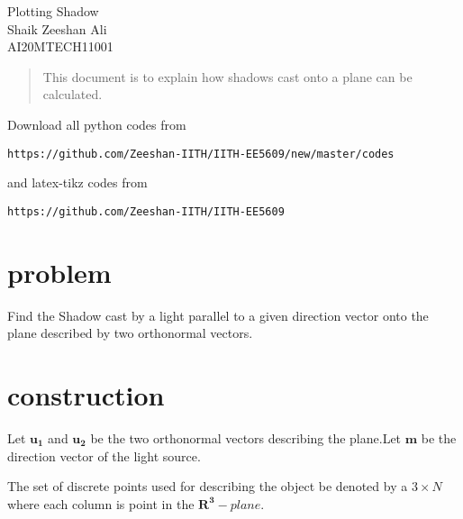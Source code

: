 \documentclass[journal,12pt,twocolumn]{IEEEtran}
\numberwithin{equation}{subsection}
\let\vec\mathbf
\begin{document}
\begin{center}
\huge Plotting Shadow\\

\large Shaik Zeeshan Ali\\
\large AI20MTECH11001\\
\end{center}
\begin{abstract}
This document is to explain how shadows cast onto a plane can be calculated.
\end{abstract}
Download all python codes from 
\begin{lstlisting}
https://github.com/Zeeshan-IITH/IITH-EE5609/new/master/codes
\end{lstlisting}

and latex-tikz codes from 
\begin{lstlisting}
https://github.com/Zeeshan-IITH/IITH-EE5609
\end{lstlisting}
\section{problem}
Find the Shadow cast by a light parallel to a given direction vector onto the plane described by two orthonormal vectors.
\section{construction}
Let $\vec{u_1}$ and $\vec{u_2}$ be the two orthonormal vectors describing the plane.Let $\vec{m}$ be the direction vector of the light source.\par
The set of discrete points used for describing the object be denoted by a $3\times N$ where each column is point in the $\vec{R^3}-plane$.
\end{document}
